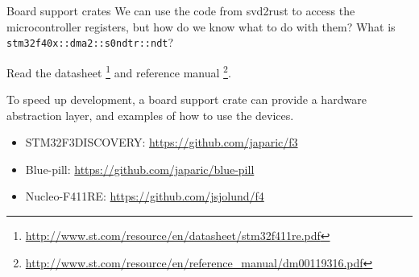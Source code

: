 \documentclass[
  aspectratio=169,
]{beamer}
\begin{document}
\begin{frame}{Board support crates}{}
We can use the code from \alert{svd2rust} to access the microcontroller registers, but how do we know what to do with them? What is \texttt{stm32f40x::dma2::s0ndtr::ndt}?

\vspace{2mm}

Read the \alert{datasheet} \footnote{\url{http://www.st.com/resource/en/datasheet/stm32f411re.pdf}} and \alert{reference manual} \footnote{\url{http://www.st.com/resource/en/reference_manual/dm00119316.pdf}}.

\vspace{2mm}

To speed up development, a board support crate can provide a hardware abstraction layer, and examples of how to use the devices.

\begin{itemize}
  \item STM32F3DISCOVERY: \url{https://github.com/japaric/f3}
  \item Blue-pill: \url{https://github.com/japaric/blue-pill}
  \item \alert{Nucleo-F411RE}: \url{https://github.com/jsjolund/f4}
\end{itemize}
\end{frame}
\end{document}
